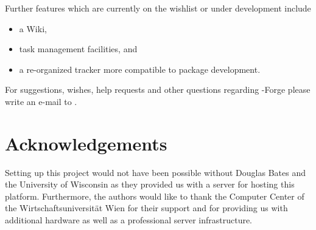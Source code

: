 Further features which are currently on the wishlist or under
development include 

\begin{itemize}
\item a Wiki,
\item task management facilities, and
\item a re-organized tracker more compatible to \R{} package development. 
\end{itemize}

For suggestions, wishes, help requests and other questions regarding
\R{}-Forge please write an e-mail to .

\section{Acknowledgements}

Setting up this project would not have been possible without Douglas
Bates and the University of Wisconsin as they provided us with a
server for hosting this platform. Furthermore, 
the authors would like to thank the Computer Center 
of the Wirtschaftsuniversit\"at Wien for
their support and for providing us with additional hardware as well as a
professional server infrastructure.

